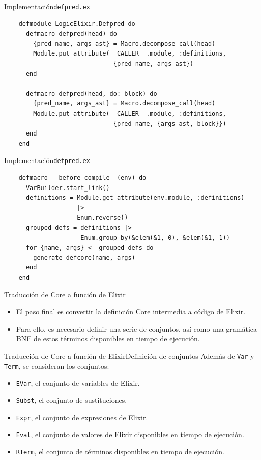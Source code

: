 \documentclass[14pt,aspectratio=169]{beamer}
\begin{document}
\begin{frame}[fragile]{Implementación}{\texttt{defpred.ex}}
  \footnotesize \begin{verbatim}
    defmodule LogicElixir.Defpred do
      defmacro defpred(head) do
        {pred_name, args_ast} = Macro.decompose_call(head)
        Module.put_attribute(__CALLER__.module, :definitions,
                              {pred_name, args_ast})
      end

      defmacro defpred(head, do: block) do
        {pred_name, args_ast} = Macro.decompose_call(head)
        Module.put_attribute(__CALLER__.module, :definitions,
                              {pred_name, {args_ast, block}})
      end
    end
  \end{verbatim}
\end{frame}

\begin{frame}[fragile]{Implementación}{\texttt{defpred.ex}}
  \footnotesize \begin{verbatim}
    defmacro __before_compile__(env) do
      VarBuilder.start_link()
      definitions = Module.get_attribute(env.module, :definitions)
                    |>
                    Enum.reverse()
      grouped_defs = definitions |>
                     Enum.group_by(&elem(&1, 0), &elem(&1, 1))
      for {name, args} <- grouped_defs do
        generate_defcore(name, args)
      end
    end
  \end{verbatim}
\end{frame}

\begin{frame}{Traducción de Core a función de Elixir}
  \begin{itemize}
    \item El paso final es convertir la definición Core intermedia a código de Elixir.
    \item Para ello, es necesario definir una serie de conjuntos, así como una
    gramática BNF de estos términos disponibles \underline{en tiempo de ejecución}.
  \end{itemize}
\end{frame}

\begin{frame}{Traducción de Core a función de Elixir}{Definición de conjuntos}
  Además de \texttt{Var} y \texttt{Term}, se consideran los conjuntos:
  \begin{itemize}
    \item \texttt{EVar}, el conjunto de variables de Elixir.
    \item \texttt{Subst}, el conjunto de sustituciones.
    \item \texttt{Expr}, el conjunto de expresiones de Elixir.
    \item \texttt{Eval}, el conjunto de valores de Elixir disponibles en
    tiempo de ejecución.
    \item \texttt{RTerm}, el conjunto de términos disponibles en tiempo
    de ejecución.
  \end{itemize}
\end{frame}
\end{document}
